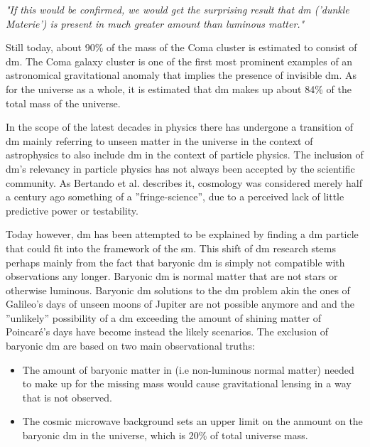 \begin{center}
\textit{"If this would be confirmed, we would get the surprising result that \gls{dm} ('dunkle Materie') is present in much greater amount than luminous matter."}
\end{center}

Still today, about 90\% of the mass of the Coma cluster is estimated to consist of \gls{dm}. The Coma galaxy cluster is one of the first most prominent examples of an astronomical gravitational anomaly that implies the presence of invisible \gls{dm}. As for the universe as a whole, it is estimated that \gls{dm} makes up about 84\% of the total mass of the universe. 

In the scope of the latest decades in physics there has undergone a transition of \gls{dm} mainly referring to unseen matter in the universe in the context of astrophysics to also include \gls{dm} in the context of particle physics. The inclusion of \gls{dm}'s relevancy in particle physics has not always been accepted by the scientific community. As Bertando et al. describes it, cosmology was considered merely half a century ago something of a ''fringe-science'', due to a perceived lack of little predictive power or testability. 

Today however, \gls{dm} has been attempted to be explained by finding a \gls{dm} particle that could fit into the framework of the \gls{sm}. This shift of \gls{dm} research stems perhaps mainly from the fact that baryonic \gls{dm} is simply not compatible with observations any longer. Baryonic \gls{dm} is normal matter that are not stars or otherwise luminous. Baryonic \gls{dm} solutions to the \gls{dm} problem akin the ones of Galileo’s days of unseen moons of Jupiter are not possible anymore and and the ''unlikely'' possibility of a \gls{dm} exceeding the amount of shining matter of Poincaré's days have become instead the likely scenarios. The exclusion of baryonic \gls{dm} are based on two main observational truths: 

\begin{itemize}
    \item The amount of baryonic matter in (i.e non-luminous normal matter) needed to make up for the missing mass would cause gravitational lensing in a way that is not observed. 
    \item The cosmic microwave background sets an upper limit on the anmount on the baryonic \gls{dm} in the universe, which is 20\% of total universe mass. 
\end{itemize}

